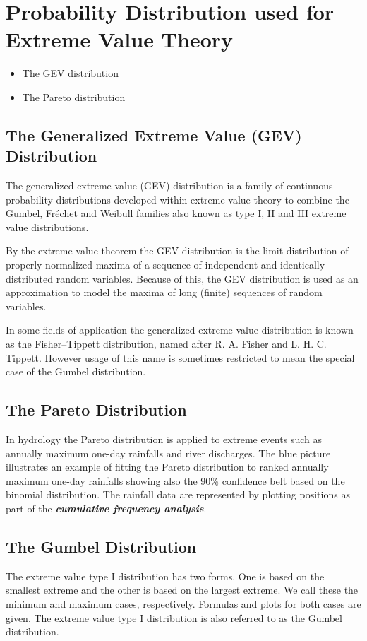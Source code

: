 \documentclass[12pt, a4paper]{article}
\theoremstyle{plain}
\theoremstyle{definition}
\theoremstyle{remark}
\begin{document}
\newpage
\section{Probability Distribution used for Extreme Value Theory}
\begin{itemize}
\item The GEV distribution
\item The Pareto distribution
\end{itemize}
\subsection{The Generalized Extreme Value (GEV) Distribution}
The generalized extreme value (GEV) distribution is a family of continuous probability distributions developed within extreme value theory to combine the Gumbel, Fréchet and Weibull families also known as type I, II and III extreme value distributions.

By the extreme value theorem the GEV distribution is the limit distribution of properly normalized maxima of a sequence of independent and identically distributed random variables. Because of this, the GEV distribution is used as an approximation to model the maxima of long (finite) sequences of random variables.

In some fields of application the generalized extreme value distribution is known as the Fisher–Tippett distribution, named after R. A. Fisher and L. H. C. Tippett. However usage of this name is sometimes restricted to mean the special case of the Gumbel distribution.
\subsection{The Pareto Distribution}

In hydrology the Pareto distribution is applied to extreme events such as annually maximum one-day rainfalls and river discharges. The blue picture illustrates an example of fitting the Pareto distribution to ranked annually maximum one-day rainfalls showing also the 90\% confidence belt based on the binomial distribution. The rainfall data are represented by plotting positions as part of the  \textbf{\emph{cumulative frequency analysis}}.

\subsection{The Gumbel Distribution}
The extreme value type I distribution has two forms. One is based
on the smallest extreme and the other is based on the largest
extreme. We call these the minimum and maximum cases,
respectively. Formulas and plots for both cases are given. The
extreme value type I distribution is also referred to as the
Gumbel distribution.
\end{document}
